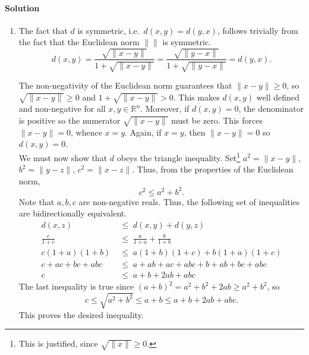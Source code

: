 \documentclass[10pt]{article}
\def\solution{\paragraph{Solution}}
\newcommand\norm[1]{\lVert #1 \rVert}
\begin{document}
        \solution
        \begin{enumerate}
                \item The fact that $d$ is symmetric, i.e.\ $d(x, y) = d(y, x)$, follows trivially from the fact that the Euclidean norm $\norm{}$
                is symmetric. 
                \[
                        d(x, y) = \frac{\sqrt{\norm{x - y}}}{1 + \sqrt{\norm{x - y}}} = \frac{\sqrt{\norm{y - x}}}{1 + \sqrt{\norm{y - x}}} = d(y, x).
                \]

                The non-negativity of the Euclidean norm guarantees that $\norm{x - y} \geq 0$, so $\sqrt{\norm{x - y}} \geq 0$
                and $1 + \sqrt{\norm{x - y}} > 0$. This makes $d(x, y)$ well defined and non-negative for all $x, y \in \mathbb{R}^n$.
                Moreover, if $d(x, y) = 0$, the denominator is positive so the numerator $\sqrt{\norm{x - y}}$ must be zero.
                This forces $\norm{x - y} = 0$, whence $x = y$. Again, if $x = y$, then $\norm{x - y} = 0$ so $d(x, y) = 0$. \\
                
                We must now show that $d$ obeys the triangle inequality. 
                Set\footnote{This is justified, since $\sqrt{\norm{x}} \geq 0$.} $a^2 = \norm{x - y}$, $b^2 = \norm{y - z}$, $c^2 = \norm{x - z}$.
                Thus, from the properties of the Euclidean norm,
                \[
                        c^2 \leq a^2 + b^2.
                \]
                Note that $a, b, c$ are non-negative reals. Thus, the following set of inequalities are bidirectionally equivalent.
                \begin{align*}
                        d(x, z)                 \;&\leq\; d(x, y) + d(y, z) \\
                        \frac{c}{1 + c}         \;&\leq\; \frac{a}{1 + a} + \frac{b}{1 + b} \\
                        c(1 + a)(1 + b)         \;&\leq\; a(1 + b)(1 + c) + b(1 + a)(1 + c) \\
                        c + ac + bc + abc       \;&\leq\; a + ab + ac + abc + b + ab + bc + abc \\
                        c                       \;&\leq\; a + b + 2ab + abc
                \end{align*}
                The last inequality is true since $(a + b)^2 = a^2 + b^2 + 2ab \geq a^2 + b^2$, so
                \[
                        c \leq \sqrt{a^2 + b^2} \leq a + b \leq a + b + 2ab + abc.
                \]
                This proves the desired inequality.


\end{enumerate}
\end{document}
